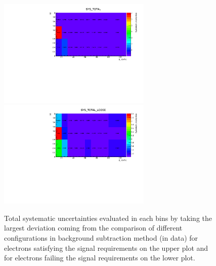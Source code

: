 \begin{figure}[h!]
\centering
\includegraphics[width=0.65\textwidth]{FIGURES/BKG/chargeFlip/2D_histo_SYS_TOTAL.pdf}
\includegraphics[width=0.65\textwidth]{FIGURES/BKG/chargeFlip/2D_histo_SYS_TOTAL_LOOSE.pdf}
\caption{\label{fig:CFsysTot} Total systematic uncertainties evaluated in each bins by taking the largest deviation coming from the comparison of different configurations in background subtraction method (in data) for electrons satisfying the signal requirements on the upper plot and for electrons failing the signal requirements on the lower plot.}
\end{figure}
